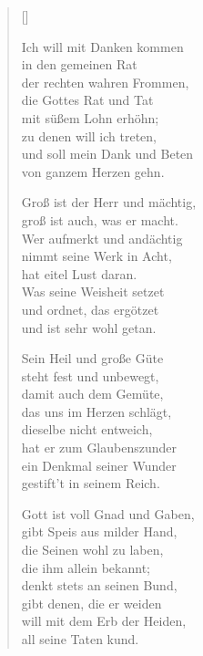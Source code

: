 \begin{multicols}{2}
\settowidth{\versewidth}{Groß ist der Herr und mächtig}
\begin{verse}[\versewidth]

 Ich will mit Danken kommen\\
in den gemeinen Rat\\
der rechten wahren Frommen,\\
die Gottes Rat und Tat\\
mit süßem Lohn erhöhn;\\
zu denen will ich treten,\\
und soll mein Dank und Beten\\
von ganzem Herzen gehn.

 Groß ist der Herr und mächtig,\\
groß ist auch, was er macht.\\
Wer aufmerkt und andächtig\\
nimmt seine Werk in Acht,\\
hat eitel Lust daran.\\
Was seine Weisheit setzet\\
und ordnet, das ergötzet\\
und ist sehr wohl getan.

 Sein Heil und große Güte\\
steht fest und unbewegt,\\
damit auch dem Gemüte,\\
das uns im Herzen schlägt,\\
dieselbe nicht entweich,\\
hat er zum Glaubenszunder\\
ein Denkmal seiner Wunder\\
gestift't in seinem Reich.

 Gott ist voll Gnad und Gaben,\\
gibt Speis aus milder Hand,\\
die Seinen wohl zu laben,\\
die ihm allein bekannt;\\
denkt stets an seinen Bund,\\
gibt denen, die er weiden\\
will mit dem Erb der Heiden,\\
all seine Taten kund.


\end{verse}
\end{multicols}
